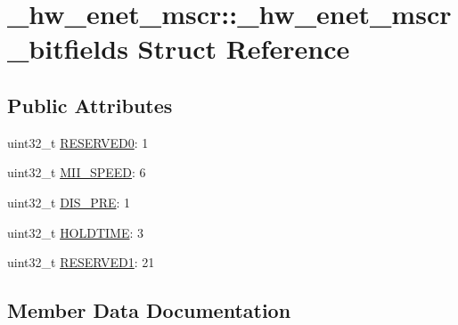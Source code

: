 \hypertarget{struct__hw__enet__mscr_1_1__hw__enet__mscr__bitfields}{}\section{\+\_\+hw\+\_\+enet\+\_\+mscr\+:\+:\+\_\+hw\+\_\+enet\+\_\+mscr\+\_\+bitfields Struct Reference}
\label{struct__hw__enet__mscr_1_1__hw__enet__mscr__bitfields}
\subsection*{Public Attributes}
\begin{DoxyCompactItemize}
\item 
uint32\+\_\+t \hyperlink{struct__hw__enet__mscr_1_1__hw__enet__mscr__bitfields_a5bc9b4fb295daeae61d20c8060d98989}{R\+E\+S\+E\+R\+V\+E\+D0}\+: 1
\item 
uint32\+\_\+t \hyperlink{struct__hw__enet__mscr_1_1__hw__enet__mscr__bitfields_a77be26e4b386e141802147870672220c}{M\+I\+I\+\_\+\+S\+P\+E\+ED}\+: 6
\item 
uint32\+\_\+t \hyperlink{struct__hw__enet__mscr_1_1__hw__enet__mscr__bitfields_a5a01d84cc32413a77a10ba9ec9a33386}{D\+I\+S\+\_\+\+P\+RE}\+: 1
\item 
uint32\+\_\+t \hyperlink{struct__hw__enet__mscr_1_1__hw__enet__mscr__bitfields_a4000edf78cbcf2d7c073e804ff9e8e5f}{H\+O\+L\+D\+T\+I\+ME}\+: 3
\item 
uint32\+\_\+t \hyperlink{struct__hw__enet__mscr_1_1__hw__enet__mscr__bitfields_a627acfeb91f5daebf3cd456f9ece2eef}{R\+E\+S\+E\+R\+V\+E\+D1}\+: 21
\end{DoxyCompactItemize}


\subsection{Member Data Documentation}
